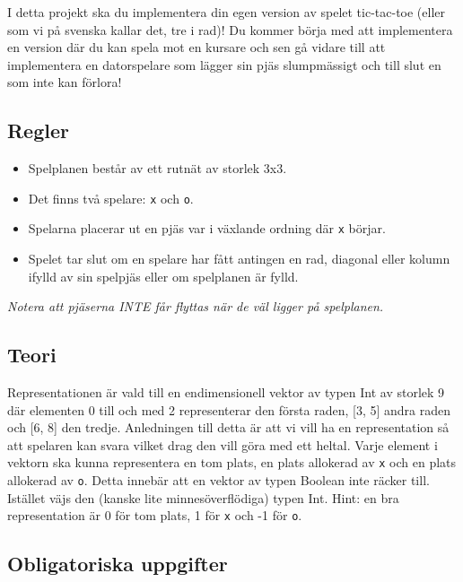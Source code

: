 
I detta projekt ska du implementera din egen version av spelet tic-tac-toe (eller som vi på svenska kallar det, tre i rad)! Du kommer börja med att implementera en version där du kan spela mot en kursare och sen gå vidare till att implementera en datorspelare som lägger sin pjäs slumpmässigt och till slut en som inte kan förlora!

\subsection{Regler}
\begin{itemize}
	\item Spelplanen består av ett rutnät av storlek 3x3.
	\item Det finns två spelare: \texttt{x} och \texttt{o}.
	\item Spelarna placerar ut en pjäs var i växlande ordning där \texttt{x} börjar.
	\item Spelet tar slut om en spelare har fått antingen en rad, diagonal eller kolumn ifylld av sin spelpjäs eller om spelplanen är fylld.
\end{itemize}
\textit{Notera att pjäserna INTE får flyttas när de väl ligger på spelplanen.}

\subsection{Teori}
Representationen är vald till en endimensionell vektor av typen Int av storlek 9 där elementen 0 till och med 2  representerar den första raden, [3, 5] andra raden och [6, 8] den tredje. Anledningen till detta är att vi vill ha en representation så att spelaren kan svara vilket drag den vill göra med ett heltal.
Varje element i vektorn ska kunna representera en tom plats, en plats allokerad av \texttt{x} och en plats allokerad av \texttt{o}. Detta innebär att en vektor av typen Boolean inte räcker till. Istället väjs den (kanske lite minnesöverflödiga) typen Int. Hint: en bra representation är 0 för tom plats, 1 för \texttt{x} och -1 för \texttt{o}. 
 
\subsection{Obligatoriska uppgifter}

